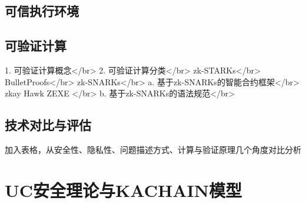 \subsection{可信执行环境}

\subsection{可验证计算}

1. 可验证计算概念</br>
2. 可验证计算分类</br>
zk-STARKs</br>
BulletProofs</br>
zk-SNARKs</br>
a. 基于zk-SNARKs的智能合约框架</br>
zkay Hawk ZEXE </br>
b. 基于zk-SNARKs的语法规范</br>

\subsection{技术对比与评估}

加入表格，从安全性、隐私性、问题描述方式、计算与验证原理几个角度对比分析

\section{UC安全理论与KACHAIN模型}